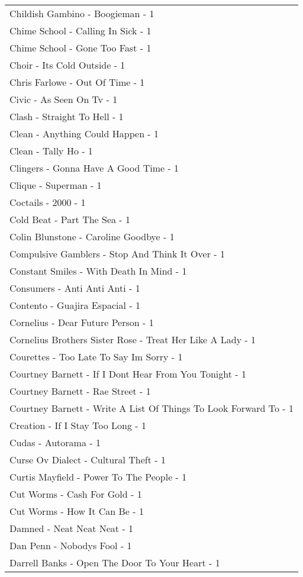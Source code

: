 \documentclass[
]{article}
\begin{document}
\begin{longtable}{l}
Childish Gambino - Boogieman - 1 \\ 
Chime School - Calling In Sick - 1 \\ 
Chime School - Gone Too Fast - 1 \\ 
Choir - Its Cold Outside - 1 \\ 
Chris Farlowe - Out Of Time - 1 \\ 
Civic - As Seen On Tv - 1 \\ 
Clash - Straight To Hell - 1 \\ 
Clean - Anything Could Happen - 1 \\ 
Clean - Tally Ho - 1 \\ 
Clingers - Gonna Have A Good Time - 1 \\ 
Clique - Superman - 1 \\ 
Coctails - 2000 - 1 \\ 
Cold Beat - Part The Sea - 1 \\ 
Colin Blunstone - Caroline Goodbye - 1 \\ 
Compulsive Gamblers - Stop And Think It Over - 1 \\ 
Constant Smiles - With Death In Mind - 1 \\ 
Consumers - Anti Anti Anti - 1 \\ 
Contento - Guajira Espacial - 1 \\ 
Cornelius - Dear Future Person - 1 \\ 
Cornelius Brothers Sister Rose - Treat Her Like A Lady - 1 \\ 
Courettes - Too Late To Say Im Sorry - 1 \\ 
Courtney Barnett - If I Dont Hear From You Tonight - 1 \\ 
Courtney Barnett - Rae Street - 1 \\ 
Courtney Barnett - Write A List Of Things To Look Forward To - 1 \\ 
Creation - If I Stay Too Long - 1 \\ 
Cudas - Autorama - 1 \\ 
Curse Ov Dialect - Cultural Theft - 1 \\ 
Curtis Mayfield - Power To The People - 1 \\ 
Cut Worms - Cash For Gold - 1 \\ 
Cut Worms - How It Can Be - 1 \\ 
Damned - Neat Neat Neat - 1 \\ 
Dan Penn - Nobodys Fool - 1 \\ 
Darrell Banks - Open The Door To Your Heart - 1 \\ 

\end{longtable}
\end{document}
